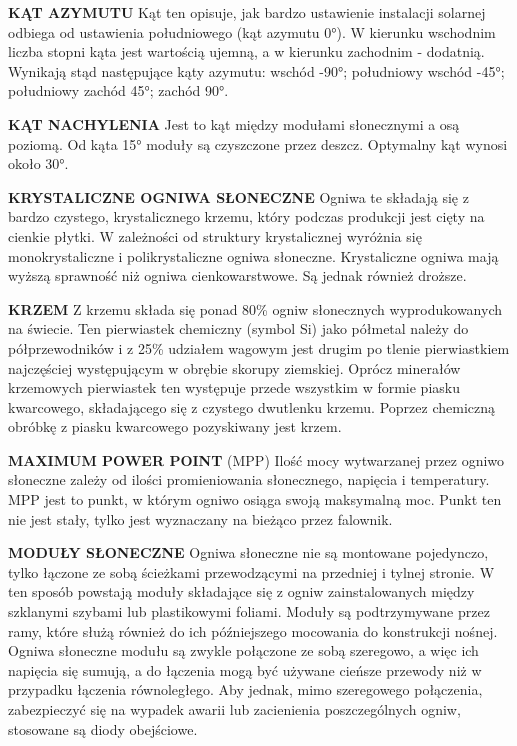 \documentclass[12pt,a4paper]{article}
\begin{document}
\textbf{KĄT AZYMUTU}
Kąt ten opisuje, jak bardzo ustawienie instalacji solarnej odbiega od ustawienia południowego (kąt azymutu 0°). W kierunku wschodnim liczba stopni kąta jest wartością ujemną, a w kierunku zachodnim - dodatnią. Wynikają stąd następujące kąty azymutu: wschód -90°; południowy wschód -45°; południowy zachód 45°; zachód 90°.


\textbf{KĄT NACHYLENIA}
Jest to kąt między modułami słonecznymi a osą poziomą. Od kąta 15° moduły są czyszczone przez deszcz. Optymalny kąt wynosi około 30°.


\textbf{KRYSTALICZNE OGNIWA SŁONECZNE}
Ogniwa te składają się z bardzo czystego, krystalicznego krzemu, który podczas produkcji jest cięty na cienkie płytki. W zależności od struktury krystalicznej wyróżnia się monokrystaliczne i polikrystaliczne ogniwa słoneczne. Krystaliczne ogniwa mają wyższą sprawność niż ogniwa cienkowarstwowe. Są jednak również droższe.


\textbf{KRZEM}
Z krzemu składa się ponad 80\% ogniw słonecznych wyprodukowanych na świecie. Ten pierwiastek chemiczny (symbol Si) jako półmetal należy do półprzewodników i z 25\% udziałem wagowym jest drugim po tlenie pierwiastkiem najczęściej występującym w obrębie skorupy ziemskiej. Oprócz minerałów krzemowych pierwiastek ten występuje przede wszystkim w formie piasku kwarcowego, składającego się z czystego dwutlenku krzemu. Poprzez chemiczną obróbkę z piasku kwarcowego pozyskiwany jest krzem.

\textbf{MAXIMUM POWER POINT} (MPP)
Ilość mocy wytwarzanej przez ogniwo słoneczne zależy od ilości promieniowania słonecznego, napięcia i temperatury. MPP jest to punkt, w którym ogniwo osiąga swoją maksymalną moc. Punkt ten nie jest stały, tylko jest wyznaczany na bieżąco przez falownik.

\textbf{MODUŁY SŁONECZNE}
Ogniwa słoneczne nie są montowane pojedynczo, tylko łączone ze sobą ścieżkami przewodzącymi na przedniej i tylnej stronie. W ten sposób powstają moduły składające się z ogniw zainstalowanych między szklanymi szybami lub plastikowymi foliami. Moduły są podtrzymywane przez ramy, które służą również do ich późniejszego mocowania do konstrukcji nośnej. Ogniwa słoneczne modułu są zwykle połączone ze sobą szeregowo, a więc ich napięcia się sumują, a do łączenia mogą być używane cieńsze przewody niż w przypadku łączenia równoległego. Aby jednak, mimo szeregowego połączenia, zabezpieczyć się na wypadek awarii lub zacienienia poszczególnych ogniw, stosowane są diody obejściowe.
\end{document}

